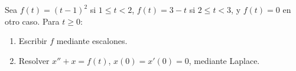 Sea \(f(t)=(t-1)^2\) si \(1\le t<2\), \(f(t)=3-t\) si \(2\le t<3\), y \(f(t)=0\) en otro caso. Para \(t\ge0\):

\begin{enumerate}[label=(\alph*),ref=\alph*,leftmargin=*]
\item Escribir \(f\) mediante escalones.
\item Resolver \(x''+x=f(t)\), \(x(0)=x'(0)=0\), mediante Laplace.
\end{enumerate}
